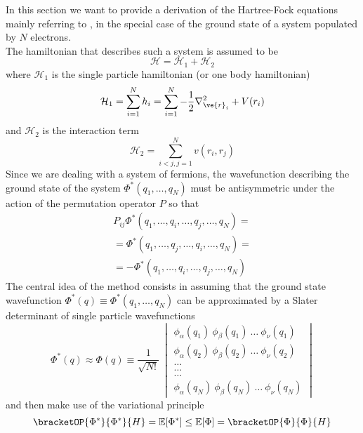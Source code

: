 In this section we want to provide a derivation of the Hartree-Fock equations mainly referring to \cite{bransden}, in the special case of the ground state of a system populated by $N$ electrons. \\
The hamiltonian that describes such a system is assumed to be 
\begin{equation*}
    \mathcal{H} = \mathcal{H}_1 + \mathcal{H}_2
\end{equation*}
where $\mathcal{H}_1$ is the single particle hamiltonian (or one body hamiltonian)
\begin{equation*}
    \mathcal{H}_1 = \sum_{i=1}^N h_i = \sum_{i=1}^N -\frac{1}{2}\nabla_{\ve{r}_i}^2 + V(r_i)
\end{equation*}
and $\mathcal{H}_2$ is the interaction term
\begin{equation*}
    \mathcal{H}_2 = \sum_{i<j,j=1}^N v(r_i, r_j)
\end{equation*}
Since we are dealing with a system of fermions, the wavefunction describing the ground state of the system $\Phi^*(q_1, \dots, q_N)$ must be antisymmetric under the action of the permutation operator $P$ so that
\begin{gather*}
    P_{ij} \Phi^*(q_1, \dots,q_i, \dots, q_j, \dots, q_N) = \\
    = \Phi^*(q_1, \dots, q_j, \dots, q_i, \dots, q_N) = \\ 
    = - \Phi^*(q_1, \dots, q_i, \dots, q_j, \dots, q_N) 
\end{gather*}
The central idea of the method consists in assuming that the ground state wavefunction $\Phi^*(q) \equiv \Phi^*(q_1, \dots, q_N)$ can be approximated by a Slater determinant of single particle wavefunctions
\begin{equation*}
    \Phi^*(q) \approx \Phi(q) \equiv \frac{1}{\sqrt{N!}} \ \begin{vmatrix} \phi_{\alpha}(q_1) \ \phi_{\beta}(q_1) \ \dots \ \phi_{\nu}(q_1) \\ 
    \phi_{\alpha}(q_2) \ \phi_{\beta}(q_2) \ \dots \ \phi_{\nu}(q_2) \\
    \dots \\
    \dots \\
    \dots \\
    \phi_{\alpha}(q_N) \ \phi_{\beta}(q_N) \ \dots \ \phi_{\nu}(q_N)
    \end{vmatrix}
\end{equation*}
and then make use of the variational principle
\begin{equation}
    \bracketOP{\Phi^*}{\Phi^*}{H} = \mathbb{E}[\Phi^*] \leq \mathbb{E}[\Phi] = \bracketOP{\Phi}{\Phi}{H}
    \label{eq:en_ground_slater_1}
\end{equation}
